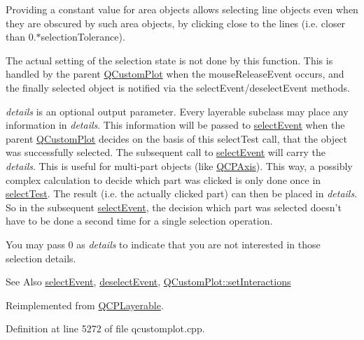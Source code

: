 Providing a constant value for area objects allows selecting line objects even when they are obscured by such area objects, by clicking close to the lines (i.\-e. closer than 0.$\ast$selection\-Tolerance).

The actual setting of the selection state is not done by this function. This is handled by the parent \hyperlink{class_q_custom_plot}{Q\-Custom\-Plot} when the mouse\-Release\-Event occurs, and the finally selected object is notified via the select\-Event/deselect\-Event methods.

{\itshape details} is an optional output parameter. Every layerable subclass may place any information in {\itshape details}. This information will be passed to \hyperlink{class_q_c_p_axis_aa8a5fe80e2898ec08ada26b5fbee9eca}{select\-Event} when the parent \hyperlink{class_q_custom_plot}{Q\-Custom\-Plot} decides on the basis of this select\-Test call, that the object was successfully selected. The subsequent call to \hyperlink{class_q_c_p_axis_aa8a5fe80e2898ec08ada26b5fbee9eca}{select\-Event} will carry the {\itshape details}. This is useful for multi-\/part objects (like \hyperlink{class_q_c_p_axis}{Q\-C\-P\-Axis}). This way, a possibly complex calculation to decide which part was clicked is only done once in \hyperlink{class_q_c_p_axis_a2877a6230920c118be65c6113089f467}{select\-Test}. The result (i.\-e. the actually clicked part) can then be placed in {\itshape details}. So in the subsequent \hyperlink{class_q_c_p_axis_aa8a5fe80e2898ec08ada26b5fbee9eca}{select\-Event}, the decision which part was selected doesn't have to be done a second time for a single selection operation.

You may pass 0 as {\itshape details} to indicate that you are not interested in those selection details.

\begin{DoxySeeAlso}{See Also}
\hyperlink{class_q_c_p_axis_aa8a5fe80e2898ec08ada26b5fbee9eca}{select\-Event}, \hyperlink{class_q_c_p_axis_a53512242cde6ec21943a3ba10dbf78c3}{deselect\-Event}, \hyperlink{class_q_custom_plot_a5ee1e2f6ae27419deca53e75907c27e5}{Q\-Custom\-Plot\-::set\-Interactions} 
\end{DoxySeeAlso}


Reimplemented from \hyperlink{class_q_c_p_layerable_a4001c4d0dfec55598efa4d531f2179a9}{Q\-C\-P\-Layerable}.



Definition at line 5272 of file qcustomplot.\-cpp.

